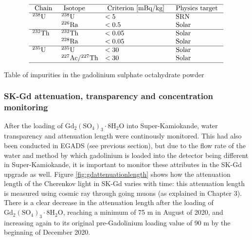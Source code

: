 \begin{table}[H]

    $$
    \begin{array}{llll}
    \hline \text { Chain } & \text { Isotope } & \text { Criterion [mBq/kg] } & \text { Physics target } \\
        \hline{ }^{238} \mathrm{U} & { }^{238} \mathrm{U} & <5 & \text { SRN } \\
    & { }^{226} \mathrm{Ra} & <0.5 & \text { Solar } \\
    \hline{ }^{232} \mathrm{Th} & { }^{232} \mathrm{Th} & <0.05 & \text { Solar } \\
    & { }^{228} \mathrm{Ra} & <0.05 & \text { Solar } \\
    \hline{ }^{235} \mathrm{U} & { }^{235} \mathrm{U} & <30 & \text { Solar } \\
    & { }^{227} \mathrm{Ac} /{ }^{227} \mathrm{Th} & <30 & \text { Solar } \\
    \hline
    \end{array}
    $$
\caption{Table of impurities in the gadolinium sulphate octahydrate powder}
\label{gdpowderradiation}
\end{table}

\subsubsection{SK-Gd attenuation, transparency and concentration monitoring}

After the loading of $\mathrm{Gd}_{2}\left(\mathrm{SO}_{4}\right)_{3} \cdot 8 \mathrm{H}_{2} \mathrm{O}$ into Super-Kamiokande, water transparency and attenuation length were continously monitored. This had also been conducted in EGADS (see previous section), but due to the flow rate of the water and method by which gadolinium is loaded into the detector being different in Super-Kamiokande, it is important to monitor these attributes in the SK-Gd upgrade as well. Figure \ref{fig:gdattenuationlength} shows how the attenuation length of the Cherenkov light in SK-Gd varies with time: this attenuation length is measured using cosmic ray through going muons (as explained in Chapter 3). There is a clear decrease in the attenuation length after the loading of $\mathrm{Gd}_{2}\left(\mathrm{SO}_{4}\right)_{3} \cdot 8 \mathrm{H}_{2} \mathrm{O}$, reaching a minimum of 75 m in August of 2020, and increasing again to its original pre-Gadolinium loading value of 90 m by the beginning of December 2020.  


